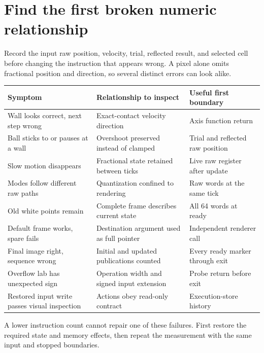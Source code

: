 \section{Find the first broken numeric relationship}\label{ball-x-failures}
Record the input raw position, velocity, trial, reflected result, and selected
cell before changing the instruction that appears wrong. A pixel alone omits
fractional position and direction, so several distinct errors can look alike.
\begin{longtable}{p{43mm}p{54mm}p{50mm}}
  \toprule
  Symptom                                       & Relationship to inspect                    & Useful first boundary            \\
  \midrule
  Wall looks correct, next step wrong           & Exact-contact velocity direction           & Axis function return             \\
  Ball sticks to or pauses at a wall            & Overshoot preserved instead of clamped     & Trial and reflected raw position \\
  Slow motion disappears                        & Fractional state retained between ticks    & Live raw register after update   \\
  Modes follow different raw paths              & Quantization confined to rendering         & Raw words at the same tick       \\
  Old white points remain                       & Complete frame describes current state     & All 64 words at ready            \\
  Default frame works, spare fails              & Destination argument used as full pointer  & Independent renderer call        \\
  Final image right, sequence wrong             & Initial and updated publications counted   & Every ready marker through exit  \\
  Overflow lab has unexpected sign              & Operation width and signed input extension & Probe return before exit         \\
  Restored input write passes visual inspection & Actions obey read-only contract            & Execution-store history          \\
  \bottomrule
\end{longtable}
A lower instruction count cannot repair one of these failures. First restore
the required state and memory effects, then repeat the measurement with the same
input and stopped boundaries.
